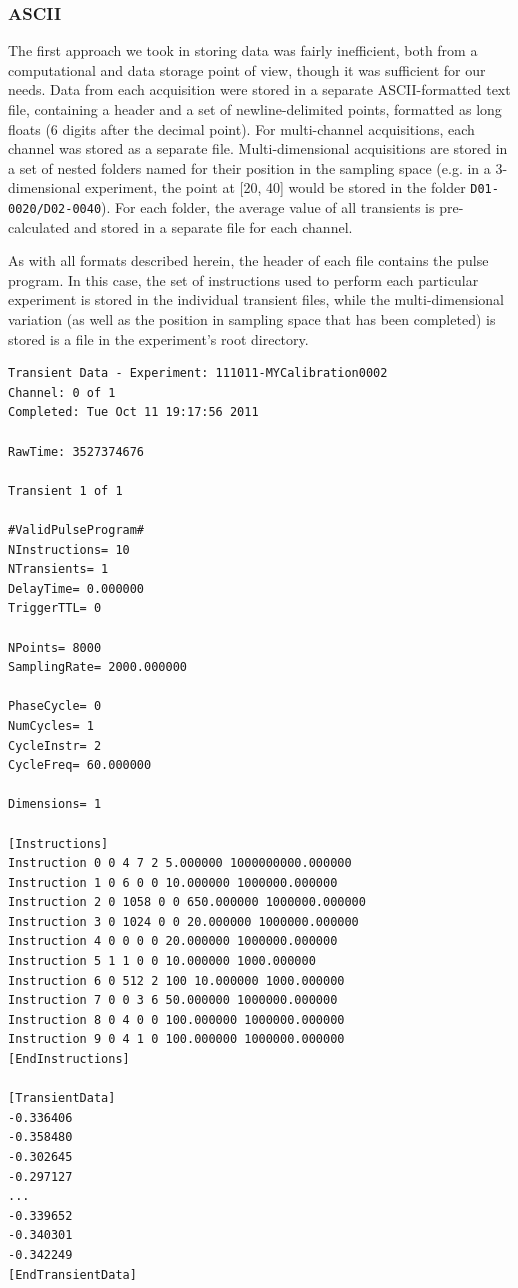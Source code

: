 \documentclass[PaulGanssle-Thesis.tex]{subfiles}
\begin{document}
\subsubsection{ASCII}
\label{console.software.data.legacy.ascii}
The first approach we took in storing data was fairly inefficient, both from a computational and data storage point of view, though it was sufficient for our needs. Data from each acquisition were stored in a separate ASCII-formatted text file, containing a header and a set of newline-delimited points, formatted as long floats (6 digits after the decimal point). For multi-channel acquisitions, each channel was stored as a separate file. Multi-dimensional acquisitions are stored in a set of nested folders named for their position in the sampling space (e.g. in a 3-dimensional experiment, the point at [20, 40] would be stored in the folder \lstinline|D01-0020/D02-0040|). For each folder, the average value of all transients is pre-calculated and stored in a separate file for each channel.

As with all formats described herein, the header of each file contains the pulse program. In this case, the set of instructions used to perform each particular experiment is stored in the individual transient files, while the multi-dimensional variation (as well as the position in sampling space that has been completed) is stored is a file in the experiment's root directory. 

\begin{lstlisting}[caption={A sample ASCII file with most of the data cut out for brevity.}, label={fig:SampleASCII},basicstyle=\small,language={}]
Transient Data - Experiment: 111011-MYCalibration0002
Channel: 0 of 1
Completed: Tue Oct 11 19:17:56 2011

RawTime: 3527374676

Transient 1 of 1

#ValidPulseProgram#
NInstructions= 10
NTransients= 1
DelayTime= 0.000000
TriggerTTL= 0

NPoints= 8000
SamplingRate= 2000.000000

PhaseCycle= 0
NumCycles= 1
CycleInstr= 2
CycleFreq= 60.000000

Dimensions= 1 

[Instructions]
Instruction 0 0 4 7 2 5.000000 1000000000.000000
Instruction 1 0 6 0 0 10.000000 1000000.000000
Instruction 2 0 1058 0 0 650.000000 1000000.000000
Instruction 3 0 1024 0 0 20.000000 1000000.000000
Instruction 4 0 0 0 0 20.000000 1000000.000000
Instruction 5 1 1 0 0 10.000000 1000.000000
Instruction 6 0 512 2 100 10.000000 1000.000000
Instruction 7 0 0 3 6 50.000000 1000000.000000
Instruction 8 0 4 0 0 100.000000 1000000.000000
Instruction 9 0 4 1 0 100.000000 1000000.000000
[EndInstructions]

[TransientData]
-0.336406
-0.358480
-0.302645
-0.297127
...
-0.339652
-0.340301
-0.342249
[EndTransientData]
\end{lstlisting}
\end{document}
